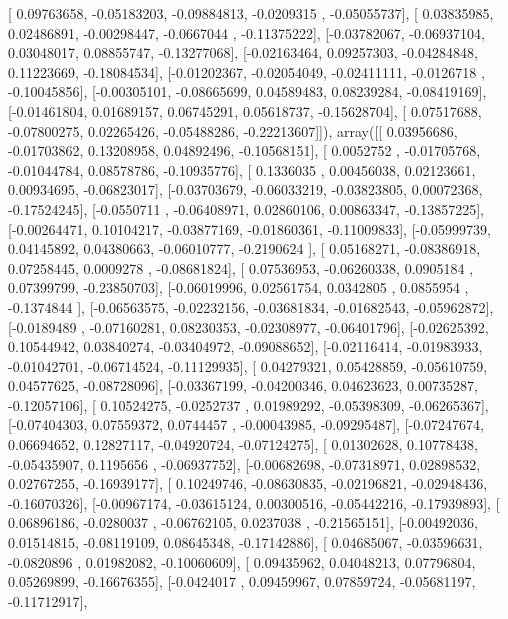 \documentclass{article}
\begin{document}
       [ 0.09763658, -0.05183203, -0.09884813, -0.0209315 , -0.05055737],
       [ 0.03835985,  0.02486891, -0.00298447, -0.0667044 , -0.11375222],
       [-0.03782067, -0.06937104,  0.03048017,  0.08855747, -0.13277068],
       [-0.02163464,  0.09257303, -0.04284848,  0.11223669, -0.18084534],
       [-0.01202367, -0.02054049, -0.02411111, -0.0126718 , -0.10045856],
       [-0.00305101, -0.08665699,  0.04589483,  0.08239284, -0.08419169],
       [-0.01461804,  0.01689157,  0.06745291,  0.05618737, -0.15628704],
       [ 0.07517688, -0.07800275,  0.02265426, -0.05488286, -0.22213607]]), array([[ 0.03956686, -0.01703862,  0.13208958,  0.04892496, -0.10568151],
       [ 0.0052752 , -0.01705768, -0.01044784,  0.08578786, -0.10935776],
       [ 0.1336035 ,  0.00456038,  0.02123661,  0.00934695, -0.06823017],
       [-0.03703679, -0.06033219, -0.03823805,  0.00072368, -0.17524245],
       [-0.0550711 , -0.06408971,  0.02860106,  0.00863347, -0.13857225],
       [-0.00264471,  0.10104217, -0.03877169, -0.01860361, -0.11009833],
       [-0.05999739,  0.04145892,  0.04380663, -0.06010777, -0.2190624 ],
       [ 0.05168271, -0.08386918,  0.07258445,  0.0009278 , -0.08681824],
       [ 0.07536953, -0.06260338,  0.0905184 ,  0.07399799, -0.23850703],
       [-0.06019996,  0.02561754,  0.0342805 ,  0.0855954 , -0.1374844 ],
       [-0.06563575, -0.02232156, -0.03681834, -0.01682543, -0.05962872],
       [-0.0189489 , -0.07160281,  0.08230353, -0.02308977, -0.06401796],
       [-0.02625392,  0.10544942,  0.03840274, -0.03404972, -0.09088652],
       [-0.02116414, -0.01983933, -0.01042701, -0.06714524, -0.11129935],
       [ 0.04279321,  0.05428859, -0.05610759,  0.04577625, -0.08728096],
       [-0.03367199, -0.04200346,  0.04623623,  0.00735287, -0.12057106],
       [ 0.10524275, -0.0252737 ,  0.01989292, -0.05398309, -0.06265367],
       [-0.07404303,  0.07559372,  0.0744457 , -0.00043985, -0.09295487],
       [-0.07247674,  0.06694652,  0.12827117, -0.04920724, -0.07124275],
       [ 0.01302628,  0.10778438, -0.05435907,  0.1195656 , -0.06937752],
       [-0.00682698, -0.07318971,  0.02898532,  0.02767255, -0.16939177],
       [ 0.10249746, -0.08630835, -0.02196821, -0.02948436, -0.16070326],
       [-0.00967174, -0.03615124,  0.00300516, -0.05442216, -0.17939893],
       [ 0.06896186, -0.0280037 , -0.06762105,  0.0237038 , -0.21565151],
       [-0.00492036,  0.01514815, -0.08119109,  0.08645348, -0.17142886],
       [ 0.04685067, -0.03596631, -0.0820896 ,  0.01982082, -0.10060609],
       [ 0.09435962,  0.04048213,  0.07796804,  0.05269899, -0.16676355],
       [-0.0424017 ,  0.09459967,  0.07859724, -0.05681197, -0.11712917],
\end{document}
